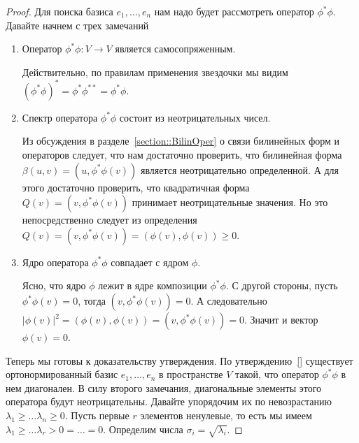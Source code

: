 \begin{proof}
Для поиска базиса $e_1,\ldots,e_n$ нам надо будет рассмотреть оператор $\phi^*\phi$.
Давайте начнем с трех замечаний
\begin{enumerate}
\item Оператор $\phi^*\phi\colon V\to V$ является самосопряженным.

Действительно, по правилам применения звездочки мы видим $(\phi^*\phi)^* = \phi^* \phi^{**} = \phi^* \phi$.

\item Спектр оператора $\phi^*\phi$ состоит из неотрицательных чисел.

Из обсуждения в разделе~\ref{section::BilinOper} о связи билинейных форм и операторов следует, что нам достаточно проверить, что билинейная форма $\beta(u, v) = (u, \phi^*\phi(v))$ является неотрицательно определенной.
А для этого достаточно проверить, что квадратичная форма $Q(v) = (v, \phi^*\phi(v))$ принимает неотрицательные значения.
Но это непосредственно следует из определения $Q(v) = (v, \phi^* \phi(v)) = (\phi(v), \phi(v)) \geqslant 0$.

\item Ядро оператора $\phi^* \phi$ совпадает с ядром $\phi$.

Ясно, что ядро $\phi$ лежит в ядре композиции $\phi^*\phi$.
С другой стороны, пусть $\phi^*\phi(v) = 0$, тогда $(v, \phi^*\phi(v))= 0$.
А следовательно $|\phi(v)|^2 = (\phi(v), \phi(v)) = (v, \phi^*\phi(v)) = 0$.
Значит и вектор $\phi(v) = 0$.
\end{enumerate}

Теперь мы готовы к доказательству утверждения.
По утверждению~\ref{} существует ортонормированный базис $e_1,\ldots, e_n$ в пространстве $V$ такой, что оператор $\phi^*\phi$ в нем диагонален.
В силу второго замечания, диагональные элементы этого оператора будут неотрицательны.
Давайте упорядочим их по невозрастанию $\lambda_1\geqslant \ldots \lambda_n \geqslant 0$.
Пусть первые $r$ элементов ненулевые, то есть мы имеем $\lambda_1 \geqslant \ldots \lambda_r > 0 = \ldots = 0$.
Определим числа $\sigma_i = \sqrt{\lambda_i}$.


\end{proof}
